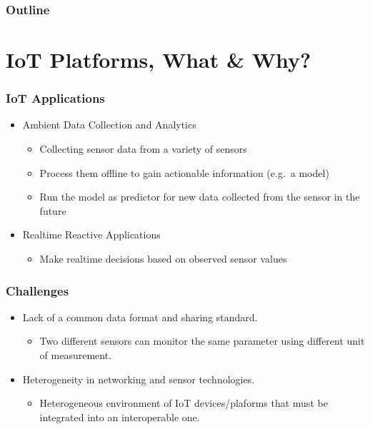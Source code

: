 \documentclass{../iot-lecture}
\subtitle{IoT Platforms}
\begin{document}
\begin{frame}
  \titlepage{}
\end{frame}
\begin{frame}
  \frametitle{Outline}
  \tableofcontents{}
\end{frame}

\section{IoT Platforms, What \& Why?}

\begin{frame}
  \frametitle{IoT Applications}
  \begin{itemize}
    \item Ambient Data Collection and Analytics
    \begin{itemize}
      \item Collecting sensor data from a variety of sensors
      \item Process them offline to gain actionable information (e.g.\ a model)
      \item Run the model as predictor for new data collected from the sensor in the future
    \end{itemize}
    \item Realtime Reactive Applications
    \begin{itemize}
      \item Make realtime decisions based on observed sensor values
    \end{itemize}
  \end{itemize}
\end{frame}

\begin{frame}
  \frametitle{Challenges}
  \begin{itemize}
    \item Lack of a common data format and sharing standard.
    \begin{itemize}
      \item Two different sensors can monitor the same parameter using different unit of measurement.
    \end{itemize}
    \item Heterogeneity in networking and sensor technologies.
    \begin{itemize}
      \item Heterogeneous environment of IoT devices/plaforms that must be integrated into an interoperable one.
    \end{itemize}
  \end{itemize}
\end{frame}
\end{document}
